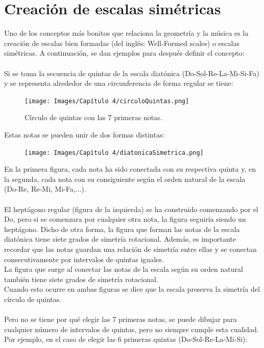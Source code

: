 \documentclass[a4paper, openright, 11pt, titlepage]{report}
\theoremstyle{definition}\newtheorem{defin}[propo]{Definition}
\theoremstyle{definition}\newtheorem{obser}[propo]{Remark}
\theoremstyle{definition}\newtheorem{ejem}[propo]{Ejemplo}
\theoremstyle{definition}\newtheorem{algoritmo}[propo]{Algoritmo}
\begin{document}
\section{Creación de escalas simétricas}
Uno de los conceptos más bonitos que relaciona la geometría y la música es la creación de escalas bien formadas (del inglés: Well-Formed scales) o escalas simétricas. A continuación, se dan ejemplos para después definir el concepto:\\\\
Si se toma la secuencia de quintas de la escala diatónica (Do-Sol-Re-La-Mi-Si-Fa) y se representa alrededor de una circunferencia de forma regular se tiene: 
\begin{figure}[H]
    \centering
    \texttt{[image: Images/Capítulo 4/circuloQuintas.png]}
    \caption{Círculo de quintas con las 7 primeras notas.}
\end{figure}
Estas notas se pueden unir de dos formas distintas:
\begin{figure}[H]
    \centering
    \texttt{[image: Images/Capítulo 4/diatonicaSimetrica.png]}
\end{figure}
En la primera figura, cada nota ha sido conectada con su respectiva quinta y, en la segunda, cada nota con su consiguiente según el orden natural de la escala (Do-Re, Re-Mi, Mi-Fa,...).\\\\
El heptágono regular (figura de la izquierda) se ha construido comenzando por el Do, pero si se comenzara por cualquier otra nota, la figura seguiría siendo un heptágono. Dicho de otra forma, la figura que forman las notas de la escala diatónica tiene siete grados de simetría rotacional. Además, es importante recordar que las notas guardan una relación de simetría entre ellas y se conectan consecutivamente por intervalos de quintas iguales.\\
La figura que surge al conectar las notas de la escala según su orden natural también tiene siete grados de simetría rotacional.\\
Cuando esto ocurre en ambas figuras se dice que la escala preserva la simetría del círculo de quintas.\\\\
Pero no se tiene por qué elegir las 7 primeras notas, se puede dibujar para cualquier número de intervalos de quintas, pero no siempre cumple esta cualidad. Por ejemplo, en el caso de elegir las 6 primeras quintas (Do-Sol-Re-La-Mi-Si):
\end{document}
